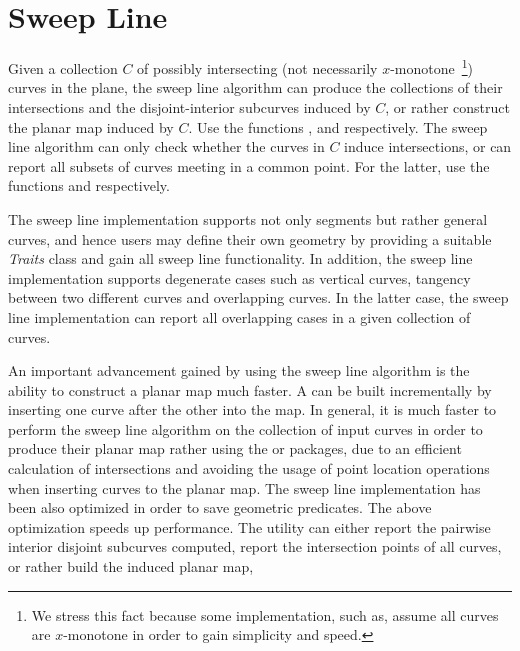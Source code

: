 \section{Sweep Line}


Given a collection $C$ of possibly intersecting 
(not necessarily $x$-monotone~\footnote{
We stress this fact because some implementation, such as, 
 assume all curves are $x$-monotone 
in order to gain simplicity and speed.}) 
curves in the plane, the sweep line algorithm can produce 
the collections of their intersections and the disjoint-interior 
subcurves induced by $C$, or rather 
construct the planar map induced by $C$. 
Use the functions ,
 and  respectively.
The sweep line algorithm can only check whether the curves in $C$
induce intersections, or can report all subsets of curves meeting in 
a common point. For the latter, use the functions 
 and 
 respectively.

The sweep line implementation supports not only segments but rather 
general curves, and hence users may define their own geometry by providing a 
suitable {\em Traits} class and gain all sweep line functionality. 
In addition, the sweep line implementation supports degenerate cases such as  
vertical curves, tangency between two different curves and overlapping curves. 
In the latter case, the sweep line implementation can report all overlapping cases 
in a given collection of curves. 
 
An important advancement gained by using the sweep line algorithm 
is the ability to construct a planar map much faster.
A  can be built incrementally by
inserting one curve after the other into the map. 
In general, it is much faster to perform the sweep line algorithm on
the collection of input curves in order to produce their planar map 
rather using the  
or  packages, due to an 
efficient calculation of intersections and avoiding the usage of 
point location operations when inserting curves to the planar map. 
The sweep line implementation has been also optimized in order to 
save geometric predicates. The above optimization speeds up performance. 
The utility can either report the pairwise interior disjoint subcurves
computed, report the intersection points of all curves, 
or rather build the induced planar map, 

